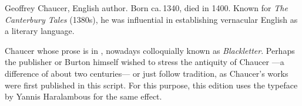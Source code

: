 {  \settoheight{\ChaucerPortraitHeight}{\usebox{\ChaucerPortraitBox}}
  \vspace*{-\ChaucerPortraitHeight-2\baselineskip}
  \par{\noindent\hfil\usebox{\ChaucerPortraitBox}\hfil\par
    \vspace*{\baselineskip}
  Geoffrey Chaucer, English author. Born ca. 1340, died in 1400. Known for \emph{The Canterbury Tales} (1380s), he was influential in establishing vernacular English as a literary language.}}Chaucer whose prose is in , nowadays colloquially known as \emph{Blackletter}. Perhaps the publisher or Burton himself wished to stress the antiquity of Chaucer ---a difference of about two centuries--- or just follow tradition, as Chaucer's works were first published in this script. For this purpose, this edition uses the \href{https://ctan.org/pkg/ygoth}{} typeface by Yannis Haralambous for the same effect.

\clearpage{}
\thispagestyle{empty}
\vspace*{\fill} 
\begin{quote} 
\centering 
{\huge{}}
\end{quote}
\vspace*{\fill}

